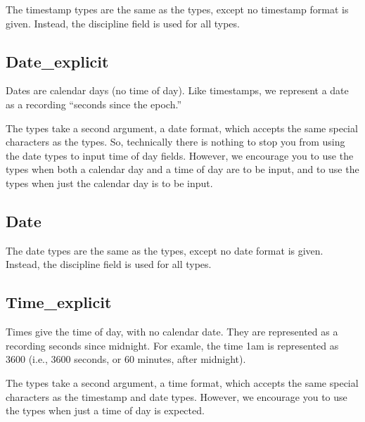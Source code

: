 The timestamp types are the same as the  types,
except no timestamp format is given.  Instead, the \pads{}
discipline field  is used
for all  types.

\subsection{Date\_explicit}

\aedBegin{}
\aedEnd{}

Dates are calendar days (no time of day).  Like timestamps, we
represent a date as a  recording ``seconds since the epoch.''

The  types take a second argument, a date format,
which accepts the same special characters as the  types.
So, technically there is nothing to stop you from using the date types
to input time of day fields.  However, we encourage you to use the
 types when both a calendar day and a time of day are to be
input, and to use the  types when just the calendar day is to be
input.

\subsection{Date}

\aedBegin{}
\aedEnd{}

The date types are the same as the  types,
except no date format is given.  Instead, the \pads{}
discipline field  is used
for all  types.

\subsection{Time\_explicit}

\aedBegin{}
\aedEnd{}

Times give the time of day, with no calendar date.  They are
represented as a  recording seconds since midnight.  For
examle, the time 1am is represented as 3600 (i.e., 3600 seconds, or 60
minutes, after midnight).

The  types take a second argument, a time format, which
accepts the same special characters as the timestamp and date types.
However, we encourage you to use the  types when just a time of
day is expected.

